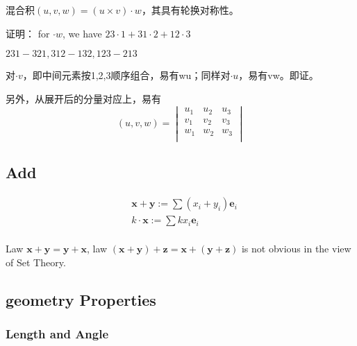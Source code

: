 \documentclass[UTF8]{../../09-Mathematics}
\begin{document}
\begin{proposition}

  混合积$(u, v, w) = (u \times  v ) \cdot w$，其具有轮换对称性。

  证明：
  for $\cdot w$, we have $23 \cdot 1 + 31 \cdot 2 + 12 \cdot 3$

  $231-321, 312-132, 123-213$

  对$\cdot v$，即中间元素按1,2,3顺序组合，易有wu；同样对$\cdot u$，易有vw。即证。
  

  另外，从展开后的分量对应上，易有
  \begin{equation}
    (u, v, w)  =
    \begin{vmatrix}
      u_1 & u_2 & u_3\\
      v_1 & v_2 & v_3\\
      w_1 & w_2 & w_3\\
    \end{vmatrix}
  \end{equation}

\end{proposition}



\subsection{Add}

\begin{equation}
    \begin{split}
    & \boldsymbol x + \boldsymbol y := \sum (x_i + y_i)\boldsymbol e_i\\
    & k \cdot \boldsymbol x := \sum kx_i\boldsymbol e_i\\
\end{split}
\end{equation}

Law $\boldsymbol{x} + \boldsymbol{y} = \boldsymbol{y} + \boldsymbol{x}$,
law $ (\boldsymbol{x} + \boldsymbol{y} )+ \boldsymbol{z} = \boldsymbol{x} +( \boldsymbol{y} + \boldsymbol{z})$ is not obvious in the view of Set Theory.


\subsection{geometry Properties}

\subsubsection{Length and Angle}
\end{document}
